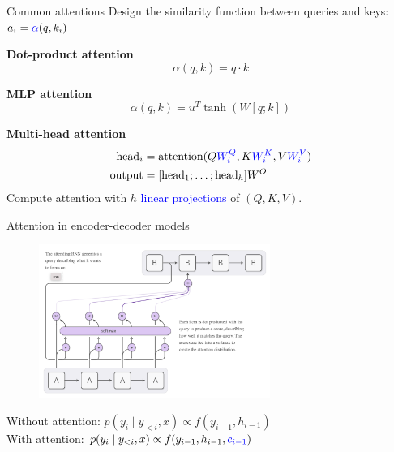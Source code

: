 \documentclass[usenames,dvipsnames,11pt,aspectratio=169]{beamer}
\newcommand{\pdfnote}[1]{}
\begin{document}
\begin{frame}
    {Common attentions}
    Design the similarity function between queries and keys:
    ${a_i}= {\color{blue}\alpha}({q}, k_i)$

    \textbf{Dot-product attention}
    $$
    \alpha(q, k) = q\cdot k
    $$

    \textbf{MLP attention}
    $$
    \alpha(q, k) = u^T \tanh(W[q;k]) 
    $$

    \textbf{Multi-head attention}
    \begin{align*}
        \text{head}_i &= \text{attention}(Q{\color{blue}W^Q_i}, K{\color{blue}W^K_i}, V{\color{blue}W^V_i}) \\
    \text{output} &= [\text{head}_1; \ldots; \text{head}_h]W^O
    \end{align*}
    Compute attention with $h$ \textcolor{blue}{linear projections} of $(Q, K, V)$.
    \pdfnote{Different types of attention/similarity}
\end{frame}

\begin{frame}
    {Attention in encoder-decoder models}
    \begin{figure}
        \includegraphics[height=5cm]{figures/s2s-attention}
    \end{figure}
    Without attention: $p(y_i \mid y_{<i}, x) \propto f(y_{i-1}, h_{i-1})$\\
    With attention: $p(y_i \mid y_{<i}, x) \propto f(y_{i-1}, h_{i-1}, {\color{blue}c_{i-1}})$
\end{frame}
\end{document}
